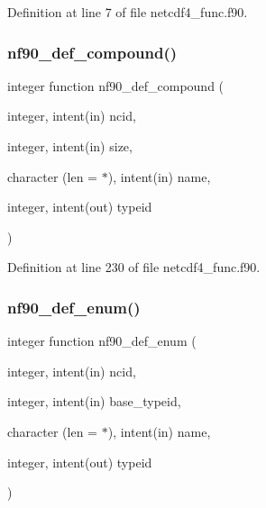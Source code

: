 Definition at line 7 of file netcdf4\+\_\+func.\+f90.

\mbox{\label{netcdf4__func_8f90_a2d544d86e4e40b8863363dde6c5e14b8}} 
\subsubsection{\texorpdfstring{nf90\+\_\+def\+\_\+compound()}{nf90\_def\_compound()}}
{\footnotesize\ttfamily integer function nf90\+\_\+def\+\_\+compound (\begin{DoxyParamCaption}\item[{integer, intent(in)}]{ncid,  }\item[{integer, intent(in)}]{size,  }\item[{character (len = $\ast$), intent(in)}]{name,  }\item[{integer, intent(out)}]{typeid }\end{DoxyParamCaption})}



Definition at line 230 of file netcdf4\+\_\+func.\+f90.

\mbox{\label{netcdf4__func_8f90_a1bb3cc5411fee3546c939aab7914c634}} 
\subsubsection{\texorpdfstring{nf90\+\_\+def\+\_\+enum()}{nf90\_def\_enum()}}
{\footnotesize\ttfamily integer function nf90\+\_\+def\+\_\+enum (\begin{DoxyParamCaption}\item[{integer, intent(in)}]{ncid,  }\item[{integer, intent(in)}]{base\+\_\+typeid,  }\item[{character (len = $\ast$), intent(in)}]{name,  }\item[{integer, intent(out)}]{typeid }\end{DoxyParamCaption})}



